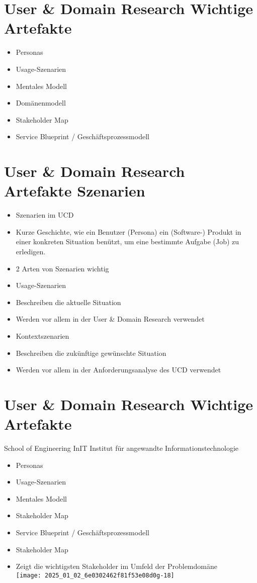 \documentclass[10pt]{article}
\begin{document}
\section*{User \& Domain Research Wichtige Artefakte}
\begin{itemize}
  \item Personas
  \item Usage-Szenarien
  \item Mentales Modell
  \item Domänenmodell
  \item Stakeholder Map
  \item Service Blueprint / Geschäftsprozessmodell
\end{itemize}

\section*{User \& Domain Research Artefakte Szenarien}
\begin{itemize}
  \item Szenarien im UCD
  \item Kurze Geschichte, wie ein Benutzer (Persona) ein (Software-) Produkt in einer konkreten Situation benützt, um eine bestimmte Aufgabe (Job) zu erledigen.
  \item 2 Arten von Szenarien wichtig
  \item Usage-Szenarien
  \item Beschreiben die aktuelle Situation
  \item Werden vor allem in der User \& Domain Research verwendet
  \item Kontextszenarien
  \item Beschreiben die zukünftige gewünschte Situation
  \item Werden vor allem in der Anforderungsanalyse des UCD verwendet
\end{itemize}

\section*{User \& Domain Research Wichtige Artefakte}
School of Engineering InIT Institut für angewandte Informationstechnologie

\begin{itemize}
  \item Personas
  \item Usage-Szenarien
  \item Mentales Modell
  \item Stakeholder Map
  \item Service Blueprint / Geschäftsprozessmodell
  \item Stakeholder Map
  \item Zeigt die wichtigsten Stakeholder im Umfeld der Problemdomäne\\
\texttt{[image: 2025\_01\_02\_6e0302462f81f53e08d0g-18]}
\end{itemize}
\end{document}

